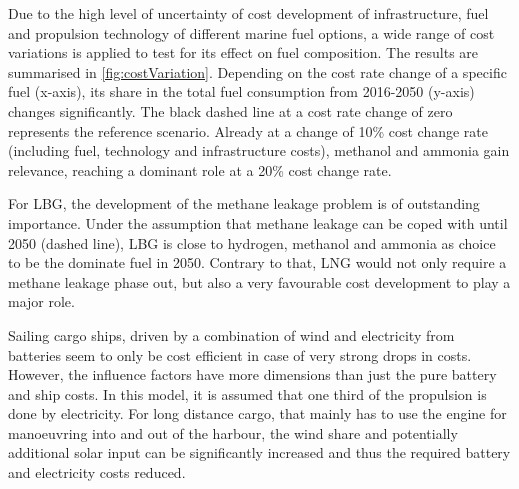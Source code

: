 \documentclass[article]{elsarticle}
\begin{document}


Due to the high level of uncertainty of cost development of infrastructure, fuel and propulsion technology of different marine fuel options, a wide range of cost variations is applied to test for its effect on fuel composition. The results are summarised in \autoref{fig:costVariation}. Depending on the cost rate change of a specific fuel (x-axis), its share in the total fuel consumption from 2016-2050 (y-axis) changes significantly. The black dashed line at a cost rate change of zero represents the reference scenario. Already at a change of 10\% cost change rate (including fuel, technology and infrastructure costs), methanol and ammonia gain relevance, reaching a dominant role at a 20\% cost change rate.

For LBG, the development of the methane leakage problem is of outstanding importance. Under the assumption that methane leakage can be coped with until 2050 (dashed line), LBG is close to hydrogen, methanol and ammonia as choice to be the dominate fuel in 2050. Contrary to that, LNG would not only require a methane leakage phase out, but also a very favourable cost development to play a major role.

Sailing cargo ships, driven by a combination of wind and electricity from batteries seem to only be cost efficient in case of very strong drops in costs. However, the influence factors have more dimensions than just the pure battery and ship costs. In this model, it is assumed that one third of the propulsion is done by electricity. For long distance cargo, that mainly has to use the engine for manoeuvring into and out of the harbour, the wind share and potentially additional solar input can be significantly increased and thus the required battery and electricity costs reduced.
\end{document}
